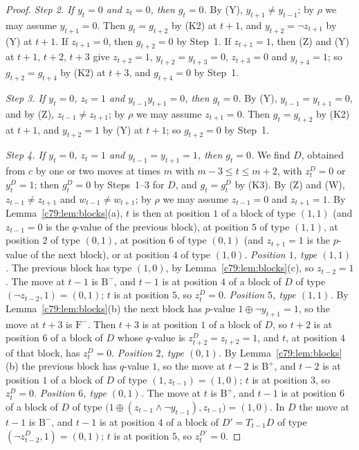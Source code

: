 \begin{proof}
\emph{Step 2. If $y_t=0$ and $z_t=0$, then $g_t=0$.} By (Y), $y_{t+1}\ne y_{t-1}$; by $\rho$ we may assume $y_{t+1}=0$. Then $g_t=g_{t+2}$ by (K2) at $t+1$, and $y_{t+2}=\neg z_{t+1}$ by (Y) at $t+1$. If $z_{t+1}=0$, then $g_{t+2}=0$ by Step~1. If $z_{t+1}=1$, then (Z) and (Y) at $t+1$, $t+2$, $t+3$ give $z_{t+2}=1$, $y_{t+2}=y_{t+3}=0$, $z_{t+3}=0$ and $y_{t+4}=1$; so $g_{t+2}=g_{t+4}$ by (K2) at $t+3$, and $g_{t+4}=0$ by Step~1.

\emph{Step 3. If $y_t=0$, $z_t=1$ and $y_{t-1}y_{t+1}=0$, then $g_t=0$.} By (Y), $y_{t-1}=y_{t+1}=0$, and by (Z), $z_{t-1}\ne z_{t+1}$; by $\rho$ we may assume $z_{t+1}=0$. Then $g_t=g_{t+2}$ by (K2) at $t+1$, and $y_{t+2}=1$ by (Y) at $t+1$; so $g_{t+2}=0$ by Step~1.

\emph{Step 4. If $y_t=0$, $z_t=1$ and $y_{t-1}=y_{t+1}=1$, then $g_t=0$.} We find $D$, obtained from $c$ by one or two moves at times $m$ with $m-3\le t\le m+2$, with $z^D_t=0$ or $y^D_t=1$; then $g^D_t=0$ by Steps~1--3 for $D$, and $g_t=g^D_t$ by (K3). By (Z) and (W), $z_{t-1}\ne z_{t+1}$ and $w_{t-1}\ne w_{t+1}$; by $\rho$ we may assume $z_{t-1}=0$ and $z_{t+1}=1$. By Lemma~\ref{c79:lem:blocks}(a), $t$ is then at position $1$ of a block of type $(1,1)$ (and $z_{t-1}=0$ is the $q$-value of the previous block), at position $5$ of type $(1,1)$, at position $2$ of type $(0,1)$, at position $6$ of type $(0,1)$ (and $z_{t+1}=1$ is the $p$-value of the next block), or at position $4$ of type $(1,0)$.
\emph{Position $1$, type $(1,1)$.} The previous block has type $(1,0)$, by Lemma~\ref{c79:lem:blocks}(c), so $z_{t-2}=1$. The move at $t-1$ is $\mathrm B^-$, and $t-1$ is at position $4$ of a block of $D$ of type $(\neg z_{t-2},1)=(0,1)$; $t$ is at position $5$, so $z^D_t=0$.
\emph{Position $5$, type $(1,1)$.} By Lemma~\ref{c79:lem:blocks}(b) the next block has $p$-value $1\oplus\neg y_{t+1}=1$, so the move at $t+3$ is $\mathrm F^-$. Then $t+3$ is at position $1$ of a block of $D$, so $t+2$ is at position $6$ of a block of $D$ whose $q$-value is $z^D_{t+2}=z_{t+2}=1$, and $t$, at position $4$ of that block, has $z^D_t=0$.
\emph{Position $2$, type $(0,1)$.} By Lemma~\ref{c79:lem:blocks}(b) the previous block has $q$-value $1$, so the move at $t-2$ is $\mathrm B^+$, and $t-2$ is at position $1$ of a block of $D$ of type $(1,z_{t-1})=(1,0)$; $t$ is at position $3$, so $z^D_t=0$.
\emph{Position $6$, type $(0,1)$.} The move at $t$ is $\mathrm B^+$, and $t-1$ is at position $6$ of a block of $D$ of type $\bigl(1\oplus(z_{t-1}\wedge\neg y_{t-1}),z_{t-1}\bigr)=(1,0)$. In $D$ the move at $t-1$ is $\mathrm B^-$, and $t-1$ is at position $4$ of a block of $D'=T_{t-1}D$ of type $(\neg z^D_{t-2},1)=(0,1)$; $t$ is at position $5$, so $z^{D'}_t=0$.

\end{proof}
